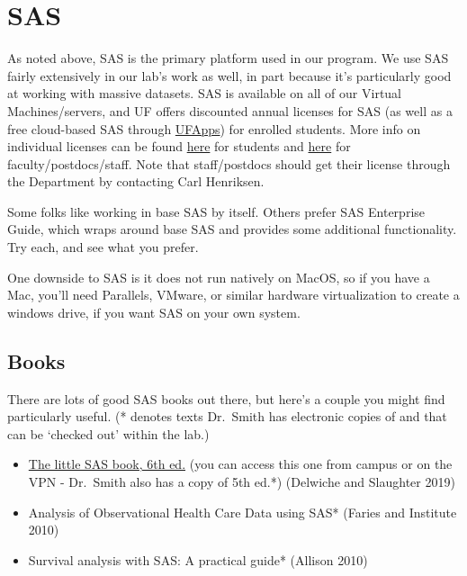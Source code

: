 \documentclass[
  letterpaper,
  DIV=11,
  numbers=noendperiod]{scrreprt}
\begin{document}
\hypertarget{sas}{%
\section{SAS}\label{sas}}

As noted above, SAS is the primary platform used in our program. We use
SAS fairly extensively in our lab's work as well, in part because it's
particularly good at working with massive datasets. SAS is available on
all of our Virtual Machines/servers, and UF offers discounted annual
licenses for SAS (as well as a free cloud-based SAS through
\href{https://info.apps.ufl.edu/}{UFApps}) for enrolled students. More
info on individual licenses can be found
\href{https://software.ufl.edu/software-listings/sas-student-licensing.html}{here}
for students and
\href{https://software.ufl.edu/software-listings/sas.html}{here} for
faculty/postdocs/staff. Note that staff/postdocs should get their
license through the Department by contacting Carl Henriksen.

Some folks like working in base SAS by itself. Others prefer SAS
Enterprise Guide, which wraps around base SAS and provides some
additional functionality. Try each, and see what you prefer.

One downside to SAS is it does not run natively on MacOS, so if you have
a Mac, you'll need Parallels, VMware, or similar hardware virtualization
to create a windows drive, if you want SAS on your own system.

\hypertarget{books}{%
\subsection{Books}\label{books}}

There are lots of good SAS books out there, but here's a couple you
might find particularly useful. (* denotes texts Dr.~Smith has
electronic copies of and that can be `checked out' within the lab.)

\begin{itemize}
\item
  \href{https://ufl-flvc.primo.exlibrisgroup.com/permalink/01FALSC_UFL/6ad6fc/alma99383273985006597}{The
  little SAS book, 6th ed.} (you can access this one from campus or on
  the VPN - Dr.~Smith also has a copy of 5th ed.*) (Delwiche and
  Slaughter 2019)
\item
  Analysis of Observational Health Care Data using SAS* (Faries and
  Institute 2010)
\item
  Survival analysis with SAS: A practical guide* (Allison 2010)
\end{itemize}
\end{document}

